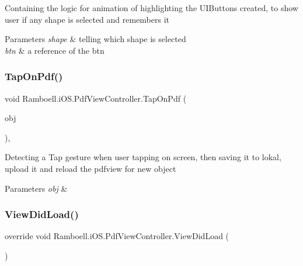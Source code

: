 Containing the logic for animation of highlighting the U\+I\+Buttons created, to show user if any shape is selected and remembers it 


\begin{DoxyParams}{Parameters}
{\em shape} & telling which shape is selected\\
\hline
{\em btn} & a reference of the btn\\
\hline
\end{DoxyParams}
\mbox{\label{class_ramboell_1_1i_o_s_1_1_pdf_view_controller_a01454d9af76d631cb95d1654a11db485}} 
\subsubsection{\texorpdfstring{Tap\+On\+Pdf()}{TapOnPdf()}}
{\footnotesize\ttfamily void Ramboell.\+i\+O\+S.\+Pdf\+View\+Controller.\+Tap\+On\+Pdf (\begin{DoxyParamCaption}\item[{U\+I\+Tap\+Gesture\+Recognizer}]{obj }\end{DoxyParamCaption})\hspace{0.3cm}{\ttfamily [inline]}, {\ttfamily [private]}}



Detecting a Tap gesture when user tapping on screen, then saving it to lokal, upload it and reload the pdfview for new object 


\begin{DoxyParams}{Parameters}
{\em obj} & \\
\hline
\end{DoxyParams}
\mbox{\label{class_ramboell_1_1i_o_s_1_1_pdf_view_controller_a6ffe0642ee3a6af8e624afe3b9450943}} 
\subsubsection{\texorpdfstring{View\+Did\+Load()}{ViewDidLoad()}}
{\footnotesize\ttfamily override void Ramboell.\+i\+O\+S.\+Pdf\+View\+Controller.\+View\+Did\+Load (\begin{DoxyParamCaption}{ }\end{DoxyParamCaption})\hspace{0.3cm}{\ttfamily [inline]}}




